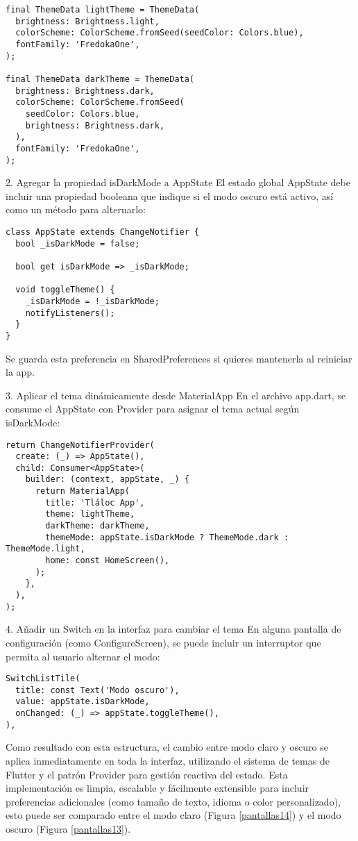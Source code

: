 \begin{verbatim}
final ThemeData lightTheme = ThemeData(
  brightness: Brightness.light,
  colorScheme: ColorScheme.fromSeed(seedColor: Colors.blue),
  fontFamily: 'FredokaOne',
);

final ThemeData darkTheme = ThemeData(
  brightness: Brightness.dark,
  colorScheme: ColorScheme.fromSeed(
    seedColor: Colors.blue,
    brightness: Brightness.dark,
  ),
  fontFamily: 'FredokaOne',
);
\end{verbatim}
2. Agregar la propiedad isDarkMode a AppState
El estado global AppState debe incluir una propiedad booleana que indique si el modo oscuro está activo, así como un método para alternarlo:

\begin{verbatim}
class AppState extends ChangeNotifier {
  bool _isDarkMode = false;

  bool get isDarkMode => _isDarkMode;

  void toggleTheme() {
    _isDarkMode = !_isDarkMode;
    notifyListeners();
  }
}
\end{verbatim}
Se guarda esta preferencia en SharedPreferences si quieres mantenerla al reiniciar la app.


3. Aplicar el tema dinámicamente desde MaterialApp
En el archivo app.dart, se consume el AppState con Provider para asignar el tema actual según isDarkMode:

\begin{verbatim}
return ChangeNotifierProvider(
  create: (_) => AppState(),
  child: Consumer<AppState>(
    builder: (context, appState, _) {
      return MaterialApp(
        title: 'Tláloc App',
        theme: lightTheme,
        darkTheme: darkTheme,
        themeMode: appState.isDarkMode ? ThemeMode.dark : ThemeMode.light,
        home: const HomeScreen(),
      );
    },
  ),
);
\end{verbatim}
4. Añadir un Switch en la interfaz para cambiar el tema
En alguna pantalla de configuración (como ConfigureScreen), se puede incluir un interruptor que permita al usuario alternar el modo:

\begin{verbatim}
SwitchListTile(
  title: const Text('Modo oscuro'),
  value: appState.isDarkMode,
  onChanged: (_) => appState.toggleTheme(),
),
\end{verbatim}
Como resultado con esta estructura, el cambio entre modo claro y oscuro se aplica inmediatamente en toda la interfaz, utilizando el sistema de temas de Flutter y el patrón Provider para gestión reactiva del estado. Esta implementación es limpia, escalable y fácilmente extensible para incluir preferencias adicionales (como tamaño de texto, idioma o color personalizado), esto puede ser comparado entre el modo claro (Figura \ref{pantallas14}) y el modo oscuro (Figura \ref{pantallas13}).







